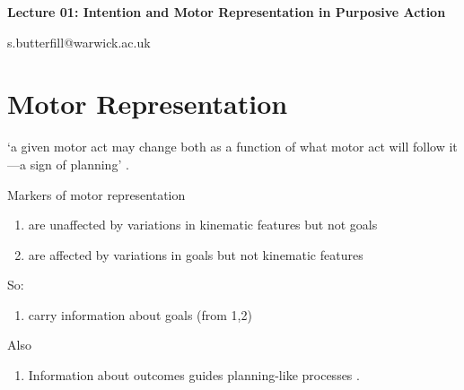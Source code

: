 \documentclass[12pt]{extarticle}
\date{}
\makeatletter
\def \ititle {Origins of Mind}
\def \iemail{s.butterfill@warwick.ac.uk}
\makeatother
\begin{document}
\begin{multicols*}{3}

\setlength\footnotesep{1em}










\def \ititle {Lecture 01: Intention and Motor Representation in Purposive Action}

\begin{center}

{\Large

\textbf{\ititle}

}



\iemail %

\end{center}




\section{Motor Representation}

‘a given motor act may change both as a function of what motor act will follow it—a sign of
planning’ \citep[p.~294]{cohen:2004_wherea}.


Markers of motor representation
\begin{enumerate}
\item are unaffected by variations in kinematic features but not goals
  \citep[e.g.][]{cattaneo:2010_state-dependent,umilta:2008pliers,rochat:2010_responses}
\item are affected by variations in goals but not kinematic features
  \citep[e.g.][]{Fogassi:2005nf,bonini:2010_ventral,Umilta:2001zr,villiger:2010_activity,koch:2010_resonance}
\end{enumerate}
So:
\begin{enumerate}[resume]
\item carry information about goals (from 1,2)
\end{enumerate}
Also
\begin{enumerate}[resume]
\item Information about outcomes guides planning-like processes
  \citep[consider][]{grafton:2007_evidence,jeannerod:1998nbo,wolpert:1995internal, miall:1996_forward,mason:2001_hand,santello:2002_patterns}.
\end{enumerate}







\end{multicols*}
\end{document}
